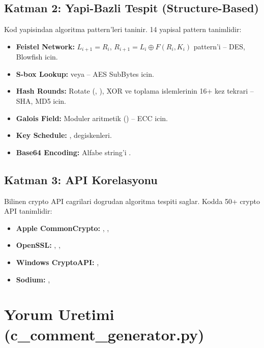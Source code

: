 \subsection{Katman 2: Yapi-Bazli Tespit (Structure-Based)}

Kod yapisindan algoritma pattern'leri taninir. 14 yapisal pattern tanimlidir:

\begin{itemize}
  \item \textbf{Feistel Network:} $L_{i+1} = R_i$, $R_{i+1} = L_i \oplus F(R_i, K_i)$
        pattern'i -- DES, Blowfish icin.
  \item \textbf{S-box Lookup:}  veya 
        -- AES SubBytes icin.
  \item \textbf{Hash Rounds:} Rotate (\code{>>>}, \code{<<<}),
        XOR ve toplama islemlerinin 16+ kez tekrari -- SHA, MD5 icin.
  \item \textbf{Galois Field:} Moduler aritmetik () -- ECC icin.
  \item \textbf{Key Schedule:} ,  degiskenleri.
  \item \textbf{Base64 Encoding:} Alfabe string'i .
\end{itemize}

\subsection{Katman 3: API Korelasyonu}

Bilinen crypto API cagrilari dogrudan algoritma tespiti saglar.
Kodda 50+ crypto API tanimlidir:

\begin{itemize}
  \item \textbf{Apple CommonCrypto:} , , 
  \item \textbf{OpenSSL:} , , 
  \item \textbf{Windows CryptoAPI:} , 
  \item \textbf{Sodium:} , 
\end{itemize}


\section{Yorum Uretimi (c\_comment\_generator.py)}
\label{sec:comment-gen}

